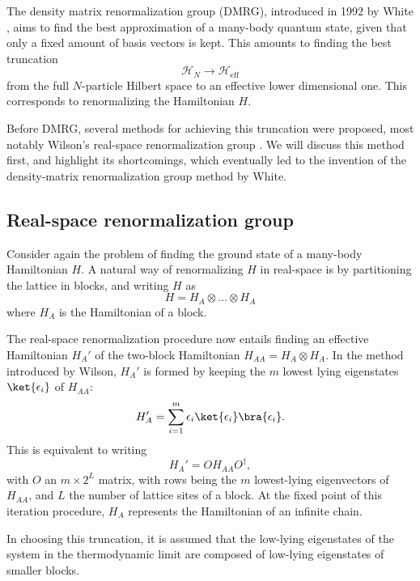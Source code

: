 The density matrix renormalization group (DMRG), introduced in 1992 by
White \cite{white1992density}, aims to find the best approximation of
a many-body quantum state, given that only a fixed amount of basis vectors
is kept. This amounts to finding the best truncation
\begin{equation}
  \mathcal{H}_N \rightarrow \mathcal{H}_{\text{eff}}
\end{equation}
from the full $N$-particle Hilbert space to an effective lower dimensional
one. This corresponds to renormalizing the Hamiltonian $H$.

Before DMRG, several methods for achieving this truncation were proposed, most notably
Wilson's real-space renormalization group \cite{wilson1975renormalization}. We will
discuss this method first, and highlight its shortcomings, which eventually led to the
invention of the density-matrix renormalization group method by White.

\subsection{Real-space renormalization group}

Consider again the problem of finding the ground state of a many-body
Hamiltonian $H$. A natural way of renormalizing $H$ in real-space is by
partitioning the lattice in blocks, and writing $H$ as
\begin{equation}
  H = H_A \otimes \ldots \otimes H_A
\end{equation}
where $H_A$ is the Hamiltonian of a block.

The real-space
renormalization procedure now entails finding an effective Hamiltonian $H_{A}'$ of the
two-block Hamiltonian $H_{AA} = H_A \otimes H_A$. In the method introduced
by Wilson, $H_{A}'$ is formed by keeping the $m$ lowest lying eigenstates
$\ket{\epsilon_{i}}$ of $H_{AA}$:
\begin{equation}
  H_{A}' = \sum_{i = 1}^{m} \epsilon_{i} \ket{\epsilon_{i}}\bra{\epsilon_{i}}.
 \end{equation}
This is equivalent to writing
\begin{equation}
  H_{A}' = O H_{AA} O^{\dagger},
\end{equation}
with $O$ an $m \times 2^L$ matrix, with rows being the $m$ lowest-lying
eigenvectors of $H_{AA}$, and $L$ the number of lattice sites of a block. At
the fixed point of this iteration procedure, $H_A$ represents the
Hamiltonian of an infinite chain.

In choosing this truncation, it is assumed that the
low-lying eigenstates of the system in the thermodynamic limit are
composed of low-lying eigenstates of smaller blocks.

